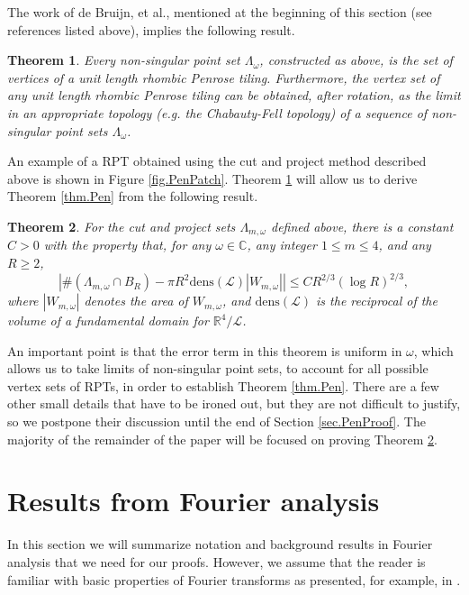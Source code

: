\documentclass[reqno]{amsart}
\newcommand{\R}{\mathbb{R}}
\newcommand{\C}{\mathbb{C}}
\newcommand{\mr}{\mathrm}
\newtheorem{theorem}{Theorem}
\newcommand{\cL}{\mathcal{L}}
\begin{document}
The work of de Bruijn, et al., mentioned at the beginning of this section (see references listed above), implies the following result.
\begin{theorem}\label{thm.PenVerts}
Every non-singular point set $\Lambda_\omega$, constructed as above, is the set of vertices of a unit length rhombic Penrose tiling. Furthermore, the vertex set of any unit length rhombic Penrose tiling can be obtained, after rotation, as the limit in an appropriate topology (e.g. the Chabauty-Fell topology) of a sequence of non-singular point sets $\Lambda_\omega$.
\end{theorem}
An example of a RPT obtained using the cut and project method described above is shown in Figure \ref{fig.PenPatch}. Theorem \ref{thm.PenVerts} will allow us to derive Theorem \ref{thm.Pen} from the following result.
\begin{theorem}\label{thm.PenCPVersion}
For the cut and project sets $\Lambda_{m,\omega}$ defined above, there is a constant $C>0$ with the property that, for any $\omega\in\C$, any integer $1\le m\le 4$, and any $R\ge 2$,
\[\left|\#\left(\Lambda_{m,\omega}\cap B_R\right)-\pi R^2\mr{dens}(\cL)\left|W_{m,\omega}\right|\right|\le CR^{2/3}(\log R)^{2/3},\]
where $|W_{m,\omega}|$ denotes the area of $W_{m,\omega}$, and $\mr{dens}(\cL)$ is the reciprocal of the volume of a fundamental domain for $\R^4/\cL$.
\end{theorem}
An important point is that the error term in this theorem is uniform in $\omega$, which allows us to take limits of non-singular point sets, to account for all possible vertex sets of RPTs, in order to establish Theorem \ref{thm.Pen}. There are a few other small details that have to be ironed out, but they are not difficult to justify, so we postpone their discussion until the end of Section \ref{sec.PenProof}. The majority of the remainder of the paper will be focused on proving Theorem \ref{thm.PenCPVersion}.




\section{Results from Fourier analysis}\label{sec.Fourier}
In this section we will summarize notation and background results in Fourier analysis that we need for our proofs. However, we assume that the reader is familiar with basic properties of Fourier transforms as presented, for example, in \cite[Chapter 1]{SteiWeis1971}.
\end{document}
